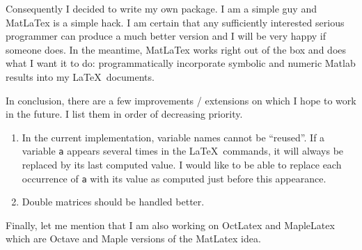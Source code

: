 \documentclass{article}
\begin{document}
  Consequently I decided to write my own package. I am a simple guy and \textsf{MatLaTex} is a simple hack.  
  I am certain that any sufficiently interested serious programmer can produce a much better version 
  and I will be very happy if someone does.  
  In the meantime, \textsf{MatLaTex} works  right out of the box and does what I want it to do:  
  programmatically incorporate symbolic and numeric \textsf{Matlab} results into my \LaTeX\  documents.  
   
  In conclusion, there are a few improvements / extensions on which I hope to work in the future. I list them  
  in order of decreasing priority.  
  \begin{enumerate} 
  \item In the current implementation, variable names cannot be ``reused''. If a variable \texttt{a} appears several times 
  in the \LaTeX\ commands, it will always be replaced by its last computed value. I would like to be able 
  to replace each occurrence of \texttt{a} with its value as computed just before this appearance. 
  \item Double matrices should be handled better. 
  \end{enumerate} 
  \noindent Finally, let me mention that I am also working on \textsf{OctLatex} and \textsf{MapleLatex} which are  
  \textsf{Octave} and \textsf{Maple} versions of the \textsf{MatLatex} idea. 
  
  
\end{document}
